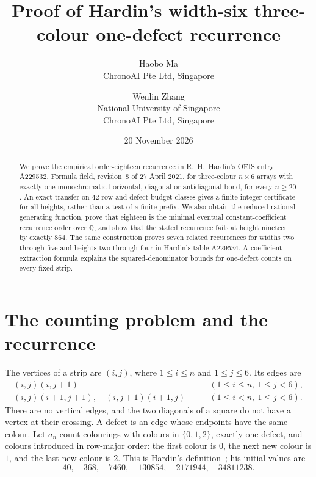 \documentclass[11pt,a4paper]{article}
\title{Proof of Hardin's width-six three-colour one-defect recurrence}
\author{Haobo Ma\\\small ChronoAI Pte Ltd, Singapore
\and Wenlin Zhang\\\small National University of Singapore\\\small ChronoAI Pte Ltd, Singapore}
\date{20 November 2026}
\newcommand{\Q}{\mathbb Q}
\begin{document}
\maketitle
\begin{abstract}
We prove the empirical order-eighteen recurrence in R.\ H.\ Hardin's
OEIS entry A229532, Formula field, revision~8 of 27 April 2021, for
three-colour $n\times6$ arrays with exactly one monochromatic horizontal,
diagonal or antidiagonal bond, for every $n\geq20$.
An exact transfer on 42 row-and-defect-budget classes gives a finite
integer certificate for all heights, rather than a test of a finite prefix.
We also obtain the reduced rational generating function, prove that
eighteen is the minimal eventual constant-coefficient recurrence order over $\Q$, and show
that the stated recurrence fails at height nineteen by exactly $864$.
The same construction proves seven related recurrences for widths
two through five and heights two through four in Hardin's table A229534.
A coefficient-extraction formula explains the squared-denominator bounds
for one-defect counts on every fixed strip.
\end{abstract}

\section{The counting problem and the recurrence}

The vertices of a strip are $(i,j)$, where $1\leq i\leq n$ and
$1\leq j\leq6$. Its edges are
\[
\begin{aligned}
 (i,j)(i,j+1) &\qquad(1\leq i\leq n,\ 1\leq j<6),\\
 (i,j)(i+1,j+1),\quad(i,j+1)(i+1,j)
 &\qquad(1\leq i<n,\ 1\leq j<6).
\end{aligned}
\]
There are no vertical edges, and the two diagonals of a square do not
have a vertex at their crossing. A defect is an edge whose endpoints have
the same colour. Let $a_n$ count colourings with colours in $\{0,1,2\}$,
exactly one defect, and colours introduced in row-major order: the first
colour is $0$, the next new colour is $1$, and the last new colour is $2$.
This is Hardin's definition~\cite{hardin}; his initial values are
\[
40,\quad368,\quad7460,\quad130854,\quad2171944,\quad34811238.
\]
\end{document}
